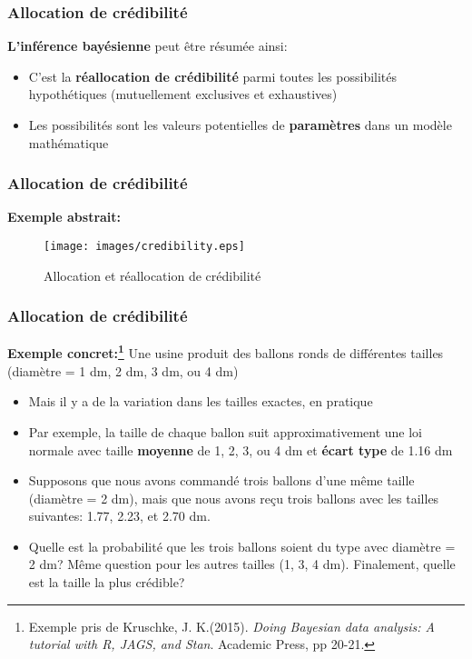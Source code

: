 \documentclass{beamer}
\begin{document}
\begin{frame}
    \frametitle{Allocation de crédibilité}
    \textbf{L'inférence bayésienne} peut être résumée ainsi: \pause
    \begin{itemize}
      \item C'est la \textbf{réallocation de crédibilité} parmi toutes les possibilités hypothétiques
            (mutuellement exclusives et exhaustives)
      \pause
      \item Les possibilités sont les valeurs potentielles de \textbf{paramètres} dans un modèle mathématique
    \end{itemize}
\end{frame}


\begin{frame}
    \frametitle{Allocation de crédibilité}
    \textbf{Exemple abstrait:}
    
    \begin{figure}
      \centering
      \texttt{[image: images/credibility.eps]}
      \caption{Allocation et réallocation de crédibilité}
    \end{figure}
\end{frame}


\begin{frame}
    \frametitle{Allocation de crédibilité}
    \textbf{Exemple concret:\footnote{
      Exemple pris de Kruschke, J. K.(2015). \emph{Doing Bayesian data analysis: A tutorial with R, JAGS, and Stan}.
            Academic Press, pp 20-21.
    }}
    Une usine produit des ballons ronds de différentes tailles (diamètre = 1 dm, 2 dm, 3 dm, ou 4 dm) \pause
    \begin{itemize}
      \item Mais il y a de la variation dans les tailles exactes, en pratique
      \pause
      \item Par exemple, la taille de chaque ballon suit approximativement une loi normale avec
            taille \textbf{moyenne} de 1, 2, 3, ou 4 dm et \textbf{écart type} de 1.16 dm
      \pause
      \item Supposons que nous avons commandé trois ballons d'une même taille (diamètre = 2 dm),
            mais que nous avons reçu trois ballons avec les tailles suivantes: 1.77, 2.23, et 2.70 dm.
      \pause
      \item Quelle est la probabilité que les trois ballons soient du type avec diamètre = 2 dm?
            Même question pour les autres tailles (1, 3, 4 dm). Finalement, quelle est la
            taille la plus crédible?
    \end{itemize}
\end{frame}
\end{document}
